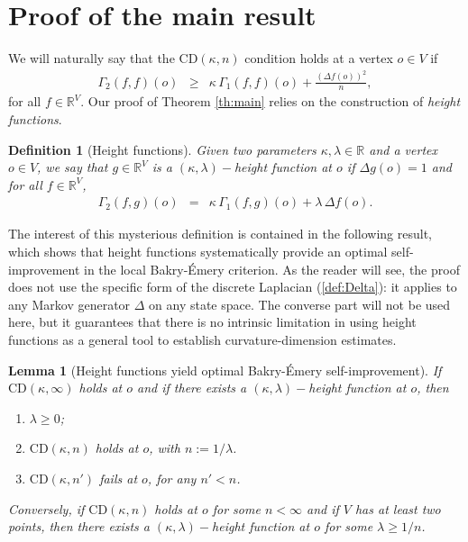 \documentclass[10pt,a4paper]{amsart}
\newtheorem{lemma}{Lemma}
\newtheorem{definition}{Definition}
\newcommand{\dR}{\mathbb {R}}
\newcommand{\CD}{\mathrm{CD}}
\begin{document}
\section{Proof of the main result}
 We will naturally say that the $\CD(\kappa,n)$ condition holds at a vertex $o\in V$ if 
\begin{eqnarray}
\label{def:locCD}
\Gamma_2(f,f)(o) & \ge &  \kappa\,\Gamma_1(f,f)(o) + \frac{(\Delta f(o))^2}{n},
\end{eqnarray}
for all  $f\in \dR^V$. Our proof of Theorem \ref{th:main} relies on the construction of \emph{height functions}. 
\begin{definition}[Height functions]Given  two parameters $\kappa,\lambda\in\dR$ and a vertex $o\in V$, we say that $g\in\dR^V$ is a $(\kappa,\lambda)-$height function at $o$ if $\Delta g(o)  =  1$ and for all $f\in \dR^V$,
\begin{eqnarray*}
\Gamma_2(f,g)(o) & = & \kappa\,\Gamma_1(f,g)(o) + \lambda\, \Delta f(o).
\end{eqnarray*}
\end{definition}
The interest of this mysterious definition is contained in the following result, which shows that height functions systematically provide an optimal self-improvement in the local Bakry-\'Emery criterion. As the reader will see, the proof does not use the specific form of the discrete Laplacian (\ref{def:Delta}): it applies to any Markov generator $\Delta$ on any state space. The converse part will not be used here, but it guarantees that there is no intrinsic limitation in using height functions as a general tool to establish curvature-dimension estimates. 
\begin{lemma}[Height functions yield optimal Bakry-\'Emery self-improvement]\label{lm:main} If $\CD(\kappa,\infty)$ holds at $o$ and  if there exists a $(\kappa,\lambda)-$height function at $o$, then
\begin{enumerate}
\item  $\lambda\ge 0$; 
\item $\CD(\kappa,n)$ holds at $o$, with $n:=1/\lambda$.
\item $\CD(\kappa,n')$ fails at $o$, for any $n'<n$. 
\end{enumerate}
Conversely, if  $\CD(\kappa,n)$ holds at $o$ for some $n<\infty$ and if $V$ has at least two points, then there exists a $(\kappa,\lambda)-$height function at $o$ for some $\lambda \ge 1/n$.
\end{lemma}
\end{document}
